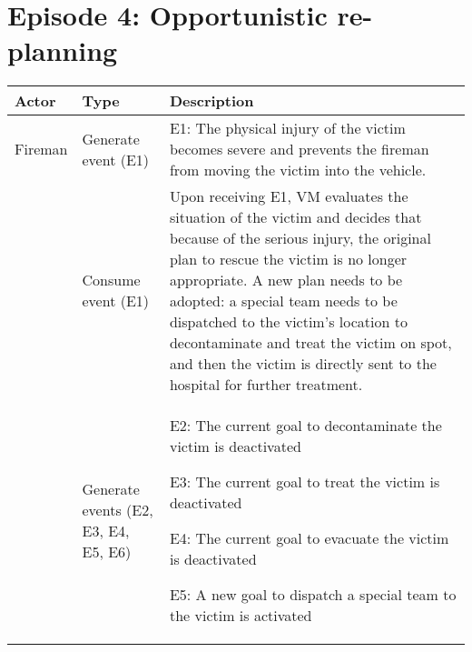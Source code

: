 \section{Episode 4: Opportunistic re-planning} %
\label{sec:episode_4_opportunistic_re_planning}
\footnotesize
{
	\begin{longtable}{>{\raggedright}p{1.2in}>{\raggedright}p{1.2in}>{\raggedright}p{3in}}
\toprule 
\textbf{Actor} & \textbf{Type} & \textbf{Description}\tabularnewline
\midrule 
Fireman & Generate event (E1) & E1: The physical injury of the victim becomes severe and prevents
the fireman from moving the victim into the vehicle.\tabularnewline
\midrule 
\multirow{2}{1.2in}{Victim manager (VM)} & Consume event (E1) & Upon receiving E1, VM evaluates the situation of the victim and decides
that because of the serious injury, the original plan to rescue the
victim is no longer appropriate. A new plan needs to be adopted: a
special team needs to be dispatched to the victim's location to decontaminate
and treat the victim on spot, and then the victim is directly sent
to the hospital for further treatment.\tabularnewline
\cmidrule{2-3} 
 & Generate events (E2, E3, E4, E5, E6) & E2: The current goal to decontaminate the victim is deactivated

E3: The current goal to treat the victim is deactivated

E4: The current goal to evacuate the victim is deactivated

E5: A new goal to dispatch a special team to the victim is activated


\end{longtable}}

